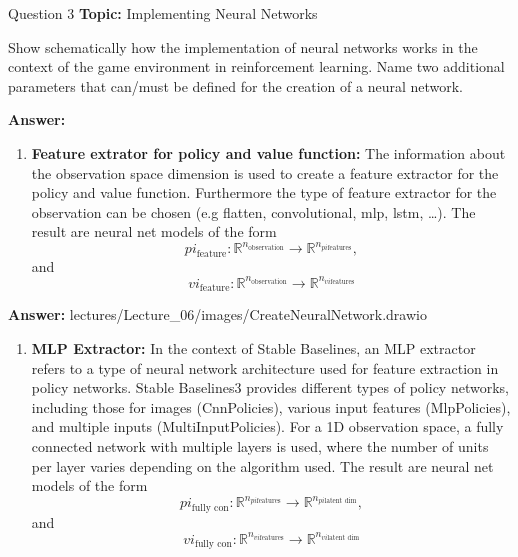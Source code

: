 \begin{frame}{Question 3}
    \textbf{Topic:} Implementing Neural Networks
    \vspace{10pt}

    Show schematically how the implementation of neural networks works in the context of the game environment in reinforcement learning. Name two additional parameters that can/must be defined for the creation of a neural network. 
\end{frame}
\begin{frame}
    \textbf{Answer:}
    \begin{enumerate}
        \item \textbf{Feature extrator for policy and value function:} The information about the observation space dimension is used to create a feature extractor for the policy and value function. Furthermore the type of feature extractor for the observation can be chosen (e.g flatten, convolutional, mlp, lstm, \dots). The result are neural net models of the form
        \[pi_{\text{feature}}: \mathbb{R}^{n_{\text{observation}}} \rightarrow \mathbb{R}^{n_{pi\text{features}}},\] and
        \[vi_{\text{feature}}: \mathbb{R}^{n_{\text{observation}}} \rightarrow \mathbb{R}^{n_{vi\text{features}}}\]
    \end{enumerate}
\end{frame}
\begin{frame}
    \textbf{Answer:} lectures/Lecture\_06/images/CreateNeuralNetwork.drawio
    \begin{enumerate}[2.]
        \item \textbf{MLP Extractor:} In the context of Stable Baselines, an MLP extractor refers to a type of neural network architecture used for feature extraction in policy networks. Stable Baselines3 provides different types of policy networks, including those for images (CnnPolicies), various input features (MlpPolicies), and multiple inputs (MultiInputPolicies). For a 1D observation space, a fully connected network with multiple layers is used, where the number of units per layer varies depending on the algorithm used. The result are neural net models of the form
        \[pi_{\text{fully con}}: \mathbb{R}^{n_{pi \text{features}}} \rightarrow \mathbb{R}^{n_{pi \text{latent dim}}},\] and
        \[vi_{\text{fully con}}: \mathbb{R}^{n_{vi \text{features}}} \rightarrow \mathbb{R}^{n_{vi \text{latent dim}}}\]
    \end{enumerate}
\end{frame}
